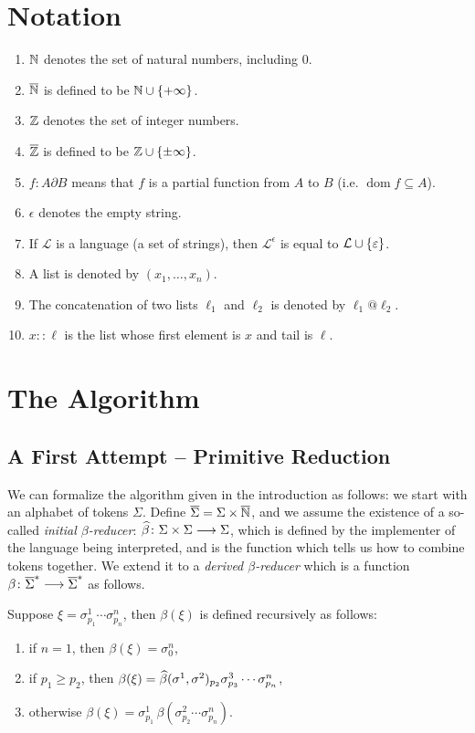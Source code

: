\documentclass{llncs}
\newcounter{algo}
\begin{document}
\section{Notation}

\begin{enumerate}
    \item $\mathbb N$ denotes the set of natural numbers, including $0$.
    \item $\overline{\mathbb N}$ is defined to be $\bN\cup\set{+\infty}$.
    \item $\mathbb Z$ denotes the set of integer numbers.
    \item $\overline{\mathbb Z}$ is defined to be $\bZ\cup\set{\pm\infty}$.
    \item $f\colon A\partial B$ means that $f$ is a partial function from $A$ to $B$ (i.e. $\operatorname{dom}f\subseteq A$).
    \item $\epsilon$ denotes the empty string.
    \item If $\mathcal L$ is a language (a set of strings), then $\mathcal L^\epsilon$ is equal to $\mathcal L\cup\set\epsilon$.
    \item A list is denoted by $(x_1,\dots,x_n)$.
    \item The concatenation of two lists $\ell_1$ and $\ell_2$ is denoted by $\ell_1@\ell_2$.
    \item $x::\ell$ is the list whose first element is $x$ and tail is $\ell$.
\end{enumerate}

\section{The Algorithm}

\subsection{A First Attempt -- Primitive Reduction}
\label{sec:firstattempt}
We can formalize the algorithm given in the introduction as follows: we start with an alphabet of tokens $\Sigma$.
Define $\overline\Sigma=\Sigma\times\overline{\mathbb N}$, and we assume the existence of a so-called \textit{initial $\beta$-reducer}:
$\widehat\beta\colon \Sigma\times\Sigma \longrightarrow \Sigma$, which is defined by the implementer of the language being interpreted, and is the function which
tells us how to combine tokens together.
We extend it to a \textit{derived $\beta$-reducer} which is a function $\beta\colon\overline\Sigma^*\longrightarrow\overline\Sigma^*$ as follows.

Suppose $\xi=\sigma^1_{p_1}\cdots\sigma^n_{p_n}$, then $\beta(\xi)$ is defined recursively as follows:
\begin{enumerate}
    \item if $n=1$, then $\beta(\xi)=\sigma^n_0$,
    \item if $p_1\geq p_2$, then $\beta(\xi)=\widehat\beta(\sigma^1,\sigma^2)_{p_2}\sigma^3_{p_3}\cdots\sigma^n_{p_n}$,
    \item otherwise $\beta(\xi)=\sigma^1_{p_1}\,\beta(\sigma^2_{p_2}\cdots\sigma^n_{p_n})$.
\end{enumerate}
\end{document}
